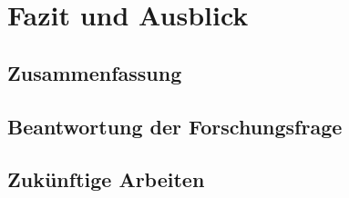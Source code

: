 \chapter{Fazit und Ausblick} %
\label{chap:fazit}

\section{Zusammenfassung}

\section{Beantwortung der Forschungsfrage}

\section{Zukünftige Arbeiten}